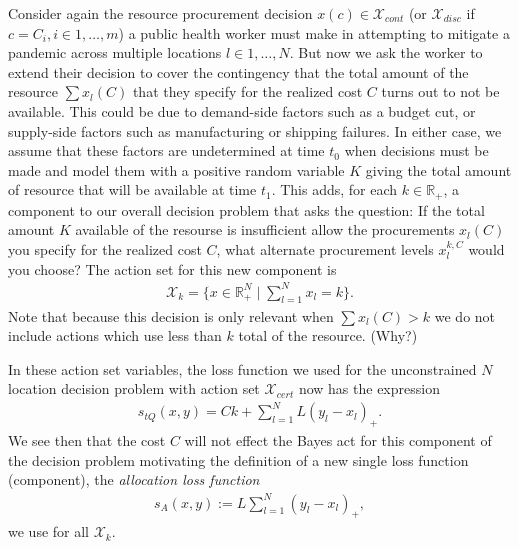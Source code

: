 \documentclass{article}
\begin{document}
Consider again the resource procurement decision $x(c) \in \mathcal{X}_{cont}$ (or $\mathcal{X}_{disc}$ if $c = C_i, i \in 1,\ldots,m$) a public health worker must make in 
attempting to mitigate a pandemic across multiple locations $l \in 1,\ldots,N$.  But now we ask the worker to extend their decision to cover the contingency that the total amount of the resource $\sum x_l(C)$ that they specify for the realized cost $C$ turns out to not be available.  This could be due to demand-side factors such as a budget cut, or supply-side factors such as manufacturing or shipping failures. In either case, we assume that these factors are undetermined at time $t_0$ when decisions must be made and model them with a positive random variable $K$ giving the total amount of resource that will be available
at time $t_1$.  This adds, for each $k \in \mathbb{R}_{+}$, a component to our overall decision problem that asks the question: If the total amount $K$ available of the resourse is insufficient allow the procurements $x_l(C)$ you specify for the realized cost $C$, what alternate procurement levels $x_l^{k,C}$ would you choose? The action set for this new component is 
\begin{align}
\mathcal{X}_k = \{x \in \mathbb{R}_{+}^N \mid \sum_{l=1}^{N} x_l = k\}.
\end{align}
Note that because this decision is only relevant when $\sum x_l(C)>k$ we do not include actions which use less than $k$ total of the resource. (Why?)
 
In these action set variables, the loss function we used for the unconstrained $N$ location decision problem with action set $\mathcal{X}_{cert}$ now has the expression
\begin{align}
s_{tQ}\left(x, y\right) = Ck + \sum_{l=1}^{N} L(y_l - x_l)_{+}.
\end{align}
We see then that the cost $C$ will not effect the Bayes act for this component of the decision problem motivating the definition of a new single loss function (component), the \emph{allocation loss function}
\begin{align}
s_{A}(x,y):= L\sum_{l=1}^{N} (y_l - x_l)_{+},
\end{align}
we use for all $\mathcal{X}_k$.
\end{document}
